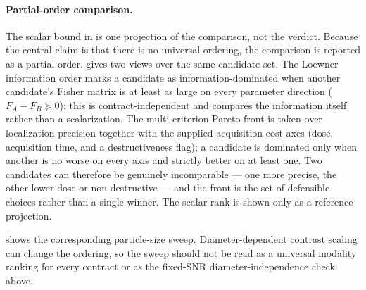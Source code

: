 \paragraph{Partial-order comparison.} The scalar bound in  is one projection of the comparison, not the verdict. Because the central claim is that there is no universal ordering, the comparison is reported as a partial order.  gives two views over the same candidate set. The Loewner information order marks a candidate as information-dominated when another candidate's Fisher matrix is at least as large on every parameter direction ($F_A-F_B\succeq 0$); this is contract-independent and compares the information itself rather than a scalarization. The multi-criterion Pareto front is taken over localization precision together with the supplied acquisition-cost axes (dose, acquisition time, and a destructiveness flag); a candidate is dominated only when another is no worse on every axis and strictly better on at least one. Two candidates can therefore be genuinely incomparable --- one more precise, the other lower-dose or non-destructive --- and the front is the set of defensible choices rather than a single winner. The scalar rank is shown only as a reference projection.


 shows the corresponding particle-size sweep. Diameter-dependent contrast scaling can change the ordering, so the sweep should not be read as a universal modality ranking for every contract or as the fixed-SNR diameter-independence check above.

